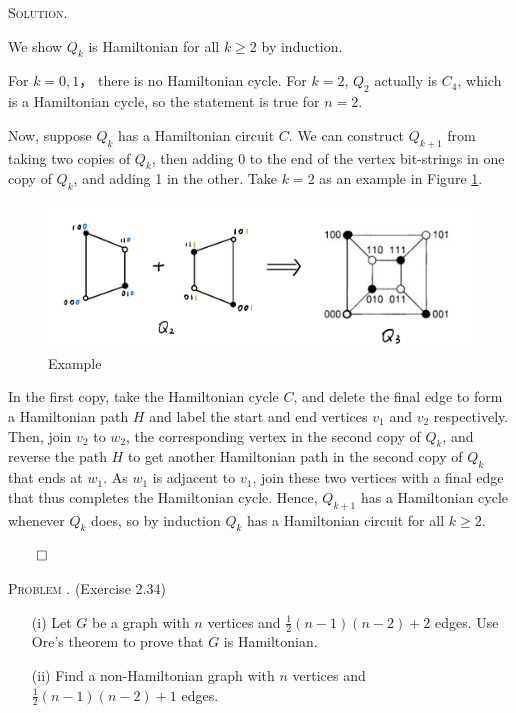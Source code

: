 \documentclass[12pt, a4paper, oneside]{ctexart}
\newcounter{problemname}
\newenvironment{problem}{\begin{framed}\stepcounter{problemname}\par\noindent\textsc{Problem \arabic{problemname}. }}{\end{framed}\par}
\newenvironment{solution}{%
	\par\noindent\textsc{Solution. }\ignorespaces
}{%
	\hfill$\qed$\par
}
\begin{document}
	\begin{solution}
		We show $Q_k$  is Hamiltonian for all $k\geq 2$ by induction. 
		
		For $k= 0,1$， there is no Hamiltonian cycle. For $k = 2$, $Q_2$ actually is $C_4$, which is a Hamiltonian cycle, so the statement is true for $n = 2$.

		Now, suppose $Q_k$ has a Hamiltonian circuit $C$. We can construct $Q_{k+1}$ from taking two copies of $Q_k$, then adding 0 to the end of the vertex bit-strings in one copy of $Q_k$, and adding 1 in the other.
		Take $k = 2$ as an example in Figure \ref{fig:Q}.

		\begin{figure}[H]
			\small
			\centering
			\includegraphics[width=0.75\columnwidth]{figure/fig9.png}
			\caption{Example}
			\label{fig:Q}
		\end{figure}
		In the first copy, take the Hamiltonian cycle $C$, and delete the final edge to form a Hamiltonian path $H$ and label the start and end vertices $v_1$ and $v_2$ respectively. 
		Then, join $v_2$ to $w_2$, the corresponding vertex in the second copy of $Q_k$, and reverse the path $H$ to get another Hamiltonian path in the second copy of $Q_k$ that ends at $w_1$. 
		As $w_1$ is adjacent to $v_1$, join these two vertices with a final edge that thus completes the Hamiltonian cycle. Hence, $Q_{k+1}$ has a Hamiltonian cycle whenever $Q_k$ does, so by induction $Q_k$ has a Hamiltonian circuit for all $k \geq 2$.

	\end{solution}


	\begin{problem}
		(Exercise 2.34)

		\begin{enumerate}
			\item[(i)] Let \( G \) be a graph with \( n \) vertices and \( \frac{1}{2}(n-1)(n-2) + 2 \) edges. Use Ore's theorem to prove that \( G \) is Hamiltonian.
			\item[(ii)] Find a non-Hamiltonian graph with \( n \) vertices and \( \frac{1}{2}(n-1)(n-2) + 1 \) edges.
		\end{enumerate}
		
	\end{problem}
\end{document}
